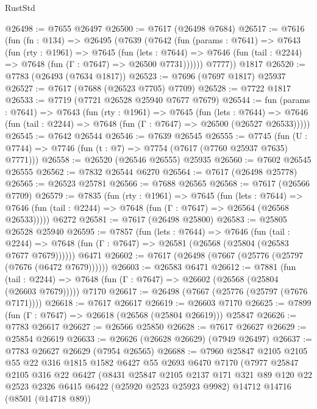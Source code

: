 \begin{lexlean}{RustStd}
\begin{coremodule}
@26498 := @7655 @26497
@26500 := @7617 (@26498 @7684)
@26517 := @7616
    (fun (fn : @134) =>
    @26495
      (@7639
        (@7642
          (fun (params : @7641) =>
          @7643
            (fun (rty : @1961) =>
            @7645
              (fun (lets : @7644) =>
              @7646 (fun (tail : @2244) => @7648 (fun (Γ : @7647) => @26500 @7731))))))
        @7777))
    @1817
@26520 := @7783 (@26493 (@7634 @1817))
@26523 := @7696 (@7697 @1817) @25937
@26527 := @7617 (@7688 (@26523 @7705) @7709)
@26528 := @7722 @1817
@26533 := @7719 (@7721 @26528 @25940 @7677 @7679)
@26544 := fun (params : @7641) =>
  @7643
    (fun (rty : @1961) =>
    @7645
      (fun (lets : @7644) =>
      @7646 (fun (tail : @2244) => @7648 (fun (Γ : @7647) => @26500 (@26527 @26533)))))
@26545 := @7642 @26544
@26546 := @7639 @26545
@26555 := @7745
    (fun (U : @7744) => @7746 (fun (t : @7) => @7754 (@7617 (@7760 @25937 @7635) @7771)))
@26558 := @26520 (@26546 @26555) @25935
@26560 := @7602 @26545 @26555
@26562 := @7832 @26544 @6270
@26564 := @7617 (@26498 @25778)
@26565 := @26523 @25781
@26566 := @7688 @26565
@26568 := @7617 (@26566 @7709)
@26579 := @7835
    (fun (rty : @1961) =>
    @7645
      (fun (lets : @7644) =>
      @7646 (fun (tail : @2244) => @7648 (fun (Γ : @7647) => @26564 (@26568 @26533)))))
    @6272
@26581 := @7617 (@26498 @25800)
@26583 := @25805 @26528 @25940
@26595 := @7857
    (fun (lets : @7644) =>
    @7646
      (fun (tail : @2244) =>
      @7648 (fun (Γ : @7647) => @26581 (@26568 (@25804 (@26583 @7677 @7679))))))
    @6471
@26602 := @7617 (@26498 (@7667 (@25776 (@25797 (@7676 (@6472 @7679))))))
@26603 := @26583 @6471
@26612 := @7881
    (fun (tail : @2244) => @7648 (fun (Γ : @7647) => @26602 (@26568 (@25804 (@26603 @7679)))))
    @7170
@26617 := @26498 (@7667 (@25776 (@25797 (@7676 @7171))))
@26618 := @7617 @26617
@26619 := @26603 @7170
@26625 := @7899 (fun (Γ : @7647) => @26618 (@26568 (@25804 @26619))) @25847
@26626 := @7783 @26617
@26627 := @26566 @25850
@26628 := @7617 @26627
@26629 := @25854 @26619
@26633 := @26626 (@26628 @26629) (@7949 @26497)
@26637 := @7783 @26627 @26629 (@7954 @26565)
@26688 := @7960
    @25847
    @2105
    @2105
    @55
    @22
    @316
    @1815
    @1582
    @6427
    @55
    @2693
    @6470
    @7170
    (@7977
      @25847
      @2105
      @316
      @22
      @6427
      (@8431
        @25847
        @2105
        @2137
        @171
        @321
        @89
        @120
        @22
        @2523
        @2326
        @6415
        @6422
        (@25920 @2523 @25923 @9982)
        @14712
        @14716
        (@8501 (@14718 @89))

\end{coremodule}
\end{lexlean}
